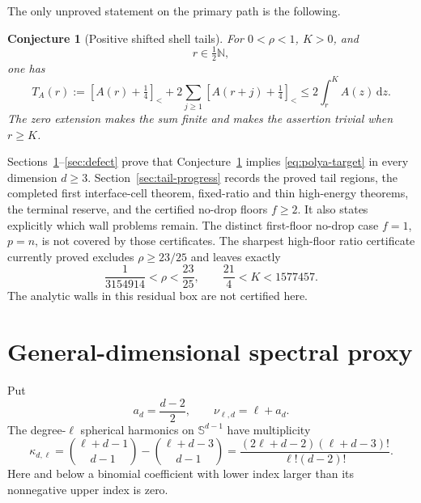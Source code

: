 \documentclass[11pt]{article}
\newtheorem{conjecture}[theorem]{Conjecture}
\theoremstyle{remark}
\newcommand{\N}{\mathbb N}
\newcommand{\sbr}[1]{[#1]_{<}}
\newcommand{\dd}{\,\mathrm d}
\begin{document}
The only unproved statement on the primary path is the following.

\begin{conjecture}[Positive shifted shell tails]
\label{conj:shifted-tail}
For $0<\rho<1$, $K>0$, and
\[
 r\in\tfrac12\N,
\]
one has
\begin{equation}
 T_A(r):=\sbr{A(r)+\tfrac14}
 +2\sum_{j\geq1}\sbr{A(r+j)+\tfrac14}
 \leq2\int_r^K A(z)\dd z.
 \label{eq:ST}
\end{equation}
The zero extension makes the sum finite and makes the assertion trivial
when $r\geq K$.
\end{conjecture}

Sections~\ref{sec:spectral}--\ref{sec:defect} prove that
Conjecture~\ref{conj:shifted-tail} implies \eqref{eq:polya-target} in every
dimension $d\geq3$.  Section~\ref{sec:tail-progress} records the proved
 tail regions, the completed first interface-cell theorem, fixed-ratio and
 thin high-energy theorems, the terminal reserve, and the certified no-drop
 floors $f\geq2$.  It also states explicitly which wall problems remain.
 The distinct first-floor no-drop case $f=1$, $p=n$, is not covered by those
 certificates.
The sharpest high-floor ratio certificate currently proved excludes
$\rho\geq23/25$ and leaves exactly
\[
 \frac1{3154914}<\rho<\frac{23}{25},\qquad
 \frac{21}{4}<K<1577457.
\]
The analytic walls in this residual box are not certified here.

\section{General-dimensional spectral proxy}
\label{sec:spectral}

Put
\[
 a_d=\frac{d-2}{2},\qquad \nu_{\ell,d}=\ell+a_d.
\]
The degree-$\ell$ spherical harmonics on $\mathbb S^{d-1}$ have
multiplicity
\begin{equation}
 \kappa_{d,\ell}
 =\binom{\ell+d-1}{d-1}-\binom{\ell+d-3}{d-1}
 =\frac{(2\ell+d-2)(\ell+d-3)!}{\ell!(d-2)!}.
 \label{eq:harmonic-multiplicity}
\end{equation}
Here and below a binomial coefficient with lower index larger than its
nonnegative upper index is zero.
\end{document}
